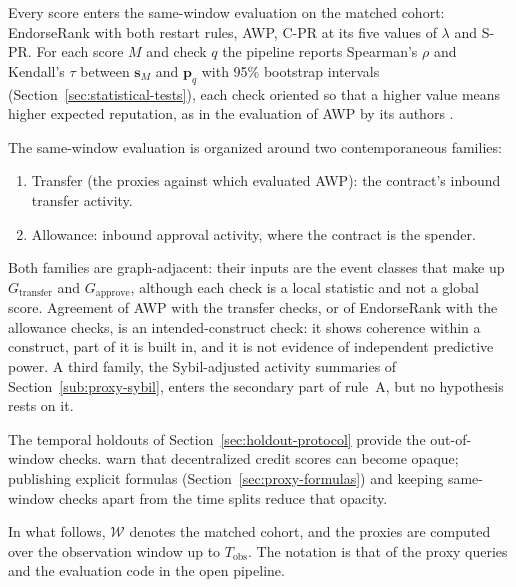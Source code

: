 
Every score enters the same-window evaluation on the matched cohort: EndorseRank with both restart rules, AWP, C-PR at its five values of $\lambda$ and S-PR. For each score $M$ and check $q$ the pipeline reports Spearman's $\rho$ and Kendall's $\tau$ between $\mathbf{s}_M$ and $\mathbf{p}_q$ with 95\% bootstrap intervals (Section~\ref{sec:statistical-tests}), each check oriented so that a higher value means higher expected reputation, as in the evaluation of AWP by its authors \parencite{do2023awp}.

The same-window evaluation is organized around two contemporaneous families:
\begin{enumerate}
\item Transfer (the proxies against which \textcite{do2023awp} evaluated AWP): the contract's inbound transfer activity.
\item Allowance: inbound approval activity, where the contract is the spender.
\end{enumerate}
Both families are graph-adjacent: their inputs are the event classes that make up $G_{\text{transfer}}$ and $G_{\text{approve}}$, although each check is a local statistic and not a global score. Agreement of AWP with the transfer checks, or of EndorseRank with the allowance checks, is an intended-construct check: it shows coherence within a construct, part of it is built in, and it is not evidence of independent predictive power. A third family, the Sybil-adjusted activity summaries of Section~\ref{sub:proxy-sybil}, enters the secondary part of rule~A, but no hypothesis rests on it.

The temporal holdouts of Section~\ref{sec:holdout-protocol} provide the out-of-window checks. \textcite{packin2024credit} warn that decentralized credit scores can become opaque; publishing explicit formulas (Section~\ref{sec:proxy-formulas}) and keeping same-window checks apart from the time splits reduce that opacity.


In what follows, $\mathcal{W}$ denotes the matched cohort, and the proxies are computed over the observation window up to $T_{\mathrm{obs}}$. The notation is that of the proxy queries and the evaluation code in the open pipeline.



